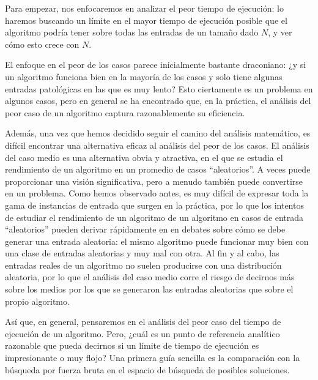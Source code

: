 \documentclass[a4paper, 12pt]{book}
\theoremstyle{dotless}
\begin{document}
Para empezar, nos enfocaremos en analizar el peor tiempo de ejecución: lo haremos buscando un límite en el mayor tiempo de ejecución posible que el algoritmo podría tener sobre todas las entradas de un tamaño dado $N$, y ver cómo esto crece con $N$. 

El enfoque en el peor de los casos parece inicialmente bastante draconiano: ¿y si un algoritmo funciona bien en la mayoría de los casos y solo tiene algunas entradas patológicas en las que es muy lento? Esto ciertamente es un problema en algunos casos, pero en general se ha encontrado que, en la práctica, el análisis del peor caso de un algoritmo captura razonablemente su eficiencia.

Además, una vez que hemos decidido seguir el camino del análisis matemático, es difícil encontrar una alternativa eficaz al análisis del peor de los casos. El análisis del caso medio es una alternativa obvia y atractiva, en el que se estudia el rendimiento de un algoritmo en un promedio de casos ``aleatorios''. A veces puede proporcionar una visión significativa, pero a menudo también puede convertirse en un problema. Como hemos observado antes, es muy difícil de expresar toda la gama de instancias de entrada que surgen en la práctica, por lo que los intentos de estudiar el rendimiento de un algoritmo de un algoritmo en casos de entrada ``aleatorios'' pueden derivar rápidamente en en debates sobre cómo se debe generar una entrada aleatoria: el mismo algoritmo puede funcionar muy bien con una clase de entradas aleatorias y muy mal con otra. Al fin y al cabo, las entradas reales de un algoritmo no suelen producirse con una distribución aleatoria, por lo que el análisis del caso medio corre el riesgo de decirnos más sobre los medios por los que se generaron las entradas aleatorias que sobre el propio algoritmo.

Así que, en general, pensaremos en el análisis del peor caso del tiempo de ejecución de un algoritmo. Pero, ¿cuál es un punto de referencia analítico razonable que pueda decirnos si un límite de tiempo de ejecución es impresionante o muy flojo? Una primera guía sencilla
es la comparación con la búsqueda por fuerza bruta en el espacio de búsqueda de posibles soluciones.
\end{document}
